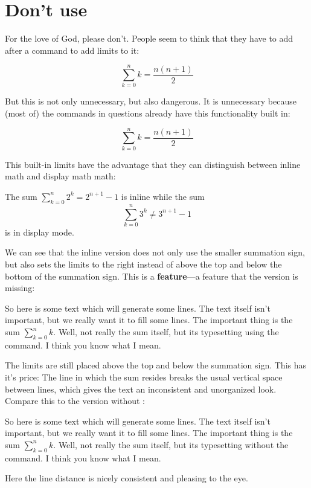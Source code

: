 \documentclass[a4paper, 10pt, abstract=on, headings=standardclasses]{scrartcl}
\begin{document}
\section{Don’t use }

For the love of God, please don’t.
People seem to think that they have to add  after a command to add limits to it:
\begin{LTXexample}[pos = r]
  \[
    \sum\limits_{k=0}^n k = \frac{n(n+1)}{2}
  \]
\end{LTXexample}
But this is not only unnecessary, but also dangerous.
It is unnecessary because (most of) the commands in questions already have this functionality built in:
\begin{LTXexample}[pos = r]
  \[
    \sum_{k=0}^n k = \frac{n(n+1)}{2}
  \]
\end{LTXexample}
This built-in limits have the advantage that they can distinguish between inline math and display math math:
\begin{LTXexample}[pos = r]
  The sum $\sum_{k=0}^n 2^k = 2^{n+1} - 1$ is inline while the sum
  \[
    \sum_{k=0}^n 3^k \neq 3^{n+1} - 1
  \]
  is in display mode.
\end{LTXexample}
We can see that the inline version does not only use the smaller summation sign, but also sets the limits to the right instead of above the top and below the bottom of the summation sign.
This is a \textbf{feature}---a feature that the  version is missing:
\begin{LTXexample}[pos = r]
  So here is some text which will generate some lines.
  The text itself isn’t important, but we really want it to fill some lines.
  The important thing is the sum $\sum\limits_{k=0}^n k$.
  Well, not really the sum itself, but its typesetting using the  command.
  I think you know what I mean.
\end{LTXexample}
The limits are still placed above the top and below the summation sign.
This has it’s price:
The line in which the sum resides breaks the usual vertical space between lines, which gives the text an inconsistent and unorganized look.
Compare this to the version without :
\begin{LTXexample}[pos = r]
  So here is some text which will generate some lines.
  The text itself isn’t important, but we really want it to fill some lines.
  The important thing is the sum $\sum_{k=0}^n k$.
  Well, not really the sum itself, but its typesetting without the  command.
  I think you know what I mean.
\end{LTXexample}
Here the line distance is nicely consistent and pleasing to the eye.
\end{document}
